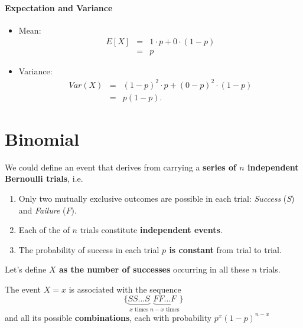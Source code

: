 \documentclass[smaller]{beamer}\usepackage[]{graphicx}\usepackage[]{color}
\newenvironment{stepitemize}{\begin{itemize}[<+->]}{\end{itemize} }
\begin{document}
\begin{frame}{\secname}
\framesubtitle{Expectation and Variance}
  \begin{stepitemize}
  \item Mean:
  \begin{eqnarray*}
  E\left[ X\right] &=&1 \cdot p+0 \cdot (1-p) \\
  &=&p
  \end{eqnarray*}

  \item Variance:
  \begin{eqnarray*}
  Var\left( X\right) &=&\left( 1-p\right) ^{2} \cdot p+\left( 0-p\right)
  ^{2} \cdot \left( 1-p\right) \\
  &=&p\left( 1-p\right).
  \end{eqnarray*}
  \end{stepitemize}
\end{frame}

\section{Binomial}

\begin{frame}{\secname}
  \begin{definition}
  We could define an event that derives from carrying a \textbf{series of $n$ independent Bernoulli trials}, i.e.

  \begin{enumerate}
  \item Only two mutually exclusive outcomes are possible in each trial: \emph{Success} (\emph{S}) and \emph{Failure} (\emph{F}).

  \item Each of the of $n$ trials constitute \textbf{independent events}.

  \item The probability of success in each trial \textbf{$p$ is constant} from trial to trial.
  \end{enumerate}

  Let's define \textbf{$X$ as the number of successes} occurring in all these $n$ trials.

  \medskip

  The event $X=x$ is associated with the sequence
  $$
  \{\underbrace{SS\dots S}_{x \text{ times}}\underbrace{FF\dots F}_{n-x \text{ times}}\}
  $$
  and all its possible \textbf{combinations}, each with probability $p^x(1-p)^{n-x}$
  \end{definition}
\end{frame}
\end{document}
